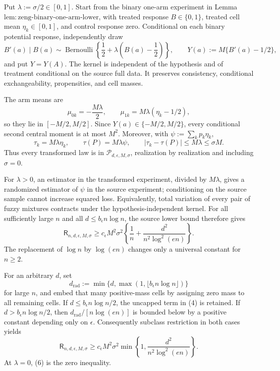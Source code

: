 Put \(\lambda:=\sigma/2\in[0,1]\).  Start from the binary one-arm experiment in Lemma~\(\mathrm{lem:zeng\text{-}binary\text{-}one\text{-}arm\text{-}lower}\), with treated response \(B\in\{0,1\}\), treated cell mean \(\eta_k\in[0,1]\), and control response zero.  Conditional on each binary potential response, independently draw
\[
 B'(a)\mid B(a)\sim\operatorname{Bernoulli}\!\left\{\frac12+\lambda\left(B(a)-\frac12\right)\right\},
 \qquad Y(a):=M\{B'(a)-1/2\},
\tag{1}
\]
and put \(Y=Y(A)\).  The kernel is independent of the hypothesis and of treatment conditional on the source full data.  It preserves consistency, conditional exchangeability, propensities, and cell masses.

The arm means are
\[
 \mu_{0k}=-\frac{M\lambda}{2},
 \qquad \mu_{1k}=M\lambda(\eta_k-1/2),
\tag{2}
\]
so they lie in \([-M/2,M/2]\).  Since \(Y(a)\in\{-M/2,M/2\}\), every conditional second central moment is at most \(M^2\).  Moreover, with \(\psi:=\sum_kp_k\eta_k\),
\[
 \tau_k=M\lambda\eta_k,
 \qquad \tau(P)=M\lambda\psi,
 \qquad |\tau_k-\tau(P)|
 \le M\lambda\le\sigma M.
\tag{3}
\]
Thus every transformed law is in \(\mathcal P_{d,\epsilon,M,\sigma}\), realization by realization and including \(\sigma=0\).

For \(\lambda>0\), an estimator in the transformed experiment, divided by \(M\lambda\), gives a randomized estimator of \(\psi\) in the source experiment; conditioning on the source sample cannot increase squared loss.  Equivalently, total variation of every pair of fuzzy mixtures contracts under the hypothesis-independent kernel.  For all sufficiently large \(n\) and all \(d\le b_{\epsilon}n\log n\), the source lower bound therefore gives
\[
 \mathsf R_{n,d,\epsilon,M,\sigma}
 \ge c_{\epsilon}M^2\sigma^2
 \left\{\frac1n+\frac{d^2}{n^2\log^2(en)}\right\}.
\tag{4}
\]
The replacement of \(\log n\) by \(\log(en)\) changes only a universal constant for \(n\ge2\).

For an arbitrary \(d\), set
\[
 d_{\mathrm{rad}}:=\min\{d,\max(1,\lfloor b_{\epsilon}n\log n\rfloor)\}
\tag{5}
\]
for large \(n\), and embed that many positive-mass cells by assigning zero mass to all remaining cells.  If \(d\le b_{\epsilon}n\log n/2\), the uncapped term in (4) is retained.  If \(d>b_{\epsilon}n\log n/2\), then \(d_{\mathrm{rad}}/[n\log(en)]\) is bounded below by a positive constant depending only on \(\epsilon\).  Consequently subclass restriction in both cases yields
\[
 \mathsf R_{n,d,\epsilon,M,\sigma}
 \ge c_{\epsilon}M^2\sigma^2
 \min\left\{1,\frac{d^2}{n^2\log^2(en)}\right\}.
\tag{6}
\]
At \(\lambda=0\), (6) is the zero inequality.

